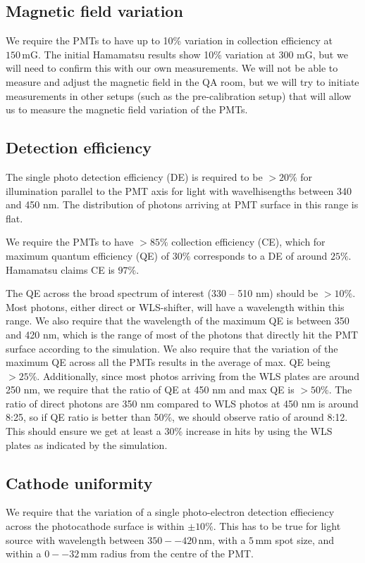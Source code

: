 \documentclass[12pt,a4paper]{article}
\begin{document}
\subsection{Magnetic field variation}
We require the PMTs to have up to 10\% variation in collection efficiency at $150\,\text{mG}$. The initial Hamamatsu results show 10\% variation at 300 mG, but we will need to confirm this with our own measurements. We will not be able to measure and adjust the magnetic field in the QA room, but we will try to initiate measurements in other setups (such as the pre-calibration setup) that will allow us to measure the magnetic field variation of the PMTs.

\subsection{Detection efficiency}
The single photo detection efficiency (DE) is required to be $>20\%$ for illumination parallel to the PMT axis for light with wavelhisengths between 340 and 450 nm. The distribution of photons arriving at PMT surface in this range is flat.

We require the PMTs to have $>85\%$ collection efficiency (CE), which for maximum quantum efficiency (QE) of $30\%$ corresponds to a DE of around $25\%$. Hamamatsu claims CE is $97\%$.

The QE across the broad spectrum of interest (330 -- 510 nm) should be $>10\%$. Most photons, either direct or WLS-shifter, will have a wavelength within this range. We also require that the wavelength of the maximum QE is between 350 and 420 nm, which is the range of most of the photons that directly hit the PMT surface according to the simulation. We also require that the variation of the maximum QE across all the PMTs results in the average of max. QE being $>25\%$. Additionally, since most photos arriving from the WLS plates are around 250 nm, we require that the ratio of QE at 450 nm and max QE is $>50\%$. The ratio of direct photons are 350 nm compared to WLS photos at 450 nm is around 8:25, so if QE ratio is better than 50\%, we should observe ratio of around 8:12. This should ensure we get at least a 30\% increase in hits by using the WLS plates as indicated by the simulation.

\subsection{Cathode uniformity}
We require that the variation of a single photo-electron detection effieciency across the photocathode surface is within $\pm10\%$. This has to be true for light source with wavelength between $350 -- 420\,\text{nm}$, with a $5\,\text{mm}$ spot size, and within a $0 -- 32\,\text{mm}$ radius from the centre of the PMT.
\end{document}
